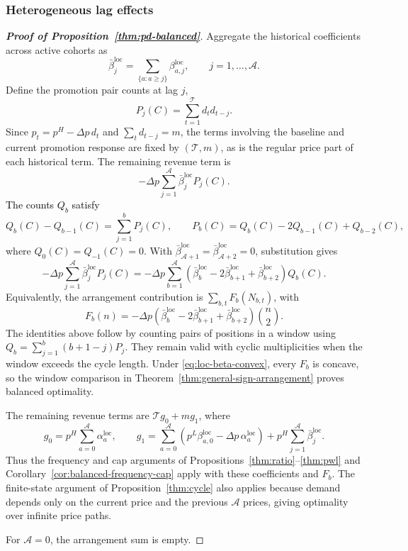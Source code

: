 \subsubsection{Heterogeneous lag effects}
\label{app:affine-recency}

\begin{proof}[\normalfont\bfseries Proof of Proposition~\ref{thm:pd-balanced}]
Aggregate the historical coefficients across active cohorts as
    \[
        \bar\beta_j^{\mathrm{loc}}
        =\sum_{\{a:a\ge j\}}\beta_{a,j}^{\mathrm{loc}},
        \qquad j=1,\ldots,\mathcal A.
    \]
    Define the promotion pair counts at lag \(j\),
    \[
        P_j(C)=\sum_{t=1}^{\mathcal T}d_t d_{t-j}.
    \]
    Since \(p_t=p^H-\Delta p\,d_t\) and \(\sum_t d_{t-j}=m\), the terms involving the baseline and current promotion response are fixed by \((\mathcal T,m)\), as is the regular price part of each historical term. The remaining revenue term is
    \[
        -\Delta p\sum_{j=1}^{\mathcal A}\bar\beta_j^{\mathrm{loc}}P_j(C).
    \]
    \textcolor{black}{The counts \(Q_b\) satisfy}
    \[
        Q_b(C)-Q_{b-1}(C)=\sum_{j=1}^{b}P_j(C),
        \qquad
        P_b(C)=Q_b(C)-2Q_{b-1}(C)+Q_{b-2}(C),
    \]
    where \(Q_0(C)=Q_{-1}(C)=0\). With \(\bar\beta_{\mathcal A+1}^{\mathrm{loc}}=\bar\beta_{\mathcal A+2}^{\mathrm{loc}}=0\), substitution gives
    \[
        -\Delta p\sum_{j=1}^{\mathcal A}\bar\beta_j^{\mathrm{loc}}P_j(C)
        =-\Delta p\sum_{b=1}^{\mathcal A}
            \left(\bar\beta_b^{\mathrm{loc}}
                  -2\bar\beta_{b+1}^{\mathrm{loc}}
                  +\bar\beta_{b+2}^{\mathrm{loc}}\right)Q_b(C).
    \]
    Equivalently, the arrangement contribution is \(\sum_{b,t}F_b(N_{b,t})\), with
\[
 F_b(n)=-\Delta p\left(\bar\beta_b^{\mathrm{loc}}-2\bar\beta_{b+1}^{\mathrm{loc}}
 +\bar\beta_{b+2}^{\mathrm{loc}}\right)\binom n2.
\]
The identities above follow by counting pairs of positions in a window using
\(Q_b=\sum_{j=1}^b(b+1-j)P_j\). They remain valid with cyclic multiplicities when the window exceeds the cycle length. Under \eqref{eq:loc-beta-convex}, every \(F_b\) is concave, so the window comparison in Theorem~\ref{thm:general-sign-arrangement} proves balanced optimality.
{\color{black}
The remaining revenue terms are \(\mathcal T g_0+mg_1\), where
\[
 g_0=p^H\sum_{a=0}^{\mathcal A}\alpha_a^{\mathrm{loc}},
 \qquad
 g_1=\sum_{a=0}^{\mathcal A}
 (p^L\beta_{a,0}^{\mathrm{loc}}-\Delta p\,\alpha_a^{\mathrm{loc}})
 +p^H\sum_{j=1}^{\mathcal A}\bar\beta_j^{\mathrm{loc}}.
\]
Thus the frequency and cap arguments of Propositions~\ref{thm:ratio}--\ref{thm:pwl} and Corollary~\ref{cor:balanced-frequency-cap} apply with these coefficients and \(F_b\). The finite-state argument of Proposition~\ref{thm:cycle} also applies because demand depends only on the current price and the previous \(\mathcal A\) prices, giving optimality over infinite price paths.
\par}
For \(\mathcal A=0\), the arrangement sum is empty.
\end{proof}
